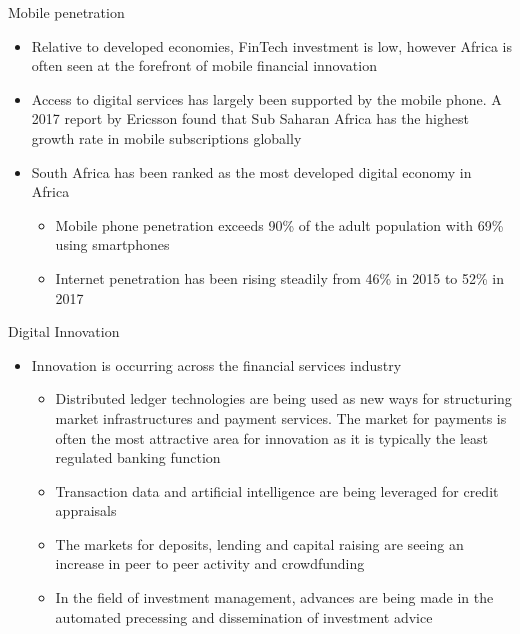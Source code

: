 \documentclass[10pt]{beamer}
\begin{document}
\begin{frame}{Mobile penetration}
	\begin{itemize}
		\item Relative to developed economies, FinTech investment is low, however Africa is often seen at the forefront of mobile financial innovation
		\item Access to digital services has largely been supported by the mobile phone. A 2017 report by Ericsson found that Sub Saharan Africa has the highest growth rate in mobile subscriptions globally
		\item South Africa has been ranked as the most developed digital economy in Africa
		\begin{itemize}
			\item Mobile phone penetration exceeds 90\% of the adult population with 69\% using smartphones
			\item Internet penetration has been rising steadily from 46\% in 2015 to 52\% in 2017
		\end{itemize}
	\end{itemize}
\end{frame}


\begin{frame}{Digital Innovation}
	\begin{itemize}
		\item Innovation is occurring across the financial services industry
		\begin{itemize}
			\item Distributed ledger technologies are being used as new ways for structuring market infrastructures and payment services. The market for payments is often the most attractive area for innovation as it is typically the least regulated banking function
			\item Transaction data and artificial intelligence are being leveraged for credit appraisals
			\item The markets for deposits, lending and capital raising are seeing an increase in peer to peer activity and crowdfunding
			\item In the field of investment management, advances are being made in the automated precessing and dissemination of investment advice
		\end{itemize}
	\end{itemize}
\end{frame}
\end{document}
